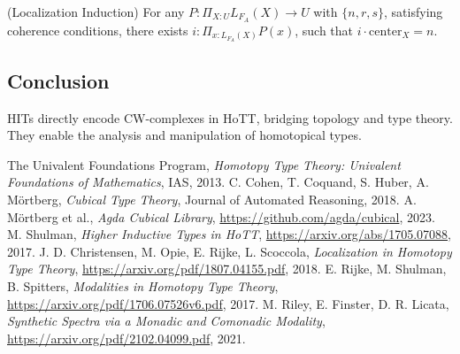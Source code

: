 \documentclass{article}
\begin{document}
\begin{theorem} (Localization Induction)
For any \( P : \Pi_{X:U} L_{F_A}(X) \to U \) with \( \{n, r, s\} \), satisfying coherence conditions,
there exists \( i : \Pi_{x:L_{F_A}(X)} P(x) \), such that \( i \cdot \text{center}_X = n \).
\end{theorem}

\subsection*{Conclusion}
HITs directly encode CW-complexes in HoTT, bridging topology and type theory.
They enable the analysis and manipulation of homotopical types.

\newpage

\begin{thebibliography}{9}

 The Univalent Foundations Program, \emph{Homotopy Type Theory: Univalent Foundations of Mathematics}, IAS, 2013.
 C. Cohen, T. Coquand, S. Huber, A. Mörtberg, \emph{Cubical Type Theory}, Journal of Automated Reasoning, 2018.
 A. Mörtberg et al., \emph{Agda Cubical Library}, \url{https://github.com/agda/cubical}, 2023.
 M. Shulman, \emph{Higher Inductive Types in HoTT}, \url{https://arxiv.org/abs/1705.07088}, 2017.
 J. D. Christensen, M. Opie, E. Rijke, L. Scoccola, \emph{Localization in Homotopy Type Theory}, \url{https://arxiv.org/pdf/1807.04155.pdf}, 2018.
 E. Rijke, M. Shulman, B. Spitters, \emph{Modalities in Homotopy Type Theory}, \url{https://arxiv.org/pdf/1706.07526v6.pdf}, 2017.
 M. Riley, E. Finster, D. R. Licata, \emph{Synthetic Spectra via a Monadic and Comonadic Modality}, \url{https://arxiv.org/pdf/2102.04099.pdf}, 2021.

\end{thebibliography}
\end{document}
